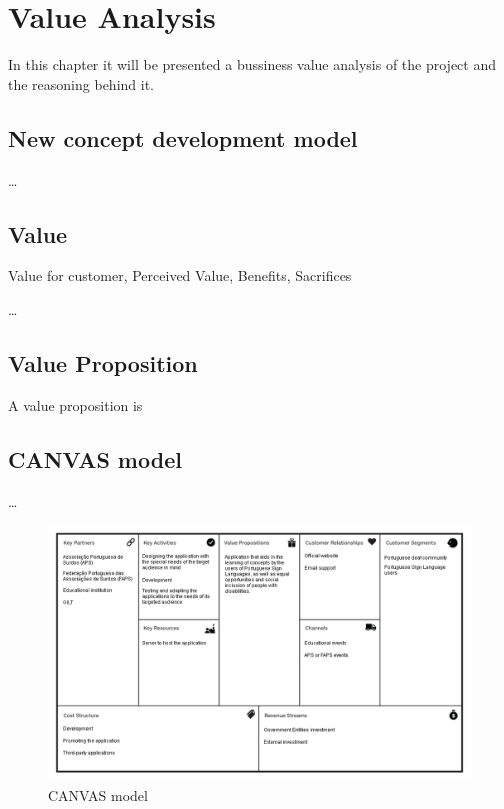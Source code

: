 
\chapter{Value Analysis} %
\label{chap:Chapter2} %

In this chapter it will be presented a bussiness value analysis of the project and the reasoning behind it. 

\section{New concept development model}

\dots

\section{Value}

Value for customer, Perceived Value, Benefits, Sacrifices

\dots

\section{Value Proposition}

A value proposition is 

\section{CANVAS model}

\dots

\begin{figure}[H]
\centering
\includegraphics[width=\textwidth,keepaspectratio]{ch2/assets/CANVAS.png}
\caption[CANVAS]{CANVAS model}
\label{fig:CANVAS}
\end{figure}

